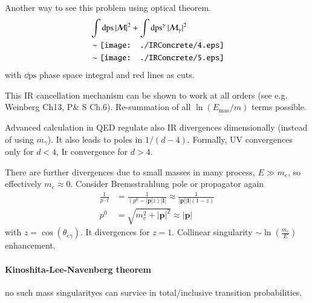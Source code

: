 Another way to see this problem using optical theorem.
\begin{align*}
&\int \dd{\text{ps}} |\M|^2 + \int \dd{\text{ps}^\gamma} |\M_\gamma|^2   \\
&\sim \vcenter{\hbox{\texttt{[image: ./IRConcrete/4.eps]}}} \\ 
&\sim \vcenter{\hbox{\texttt{[image: ./IRConcrete/5.eps]}}}
\end{align*}
with $\dd{\text{ps}}$ phase space integral and red lines as cuts.

This IR cancellation mechanism can be shown to work at all orders (see e.g. Weinberg Ch13, P\& S Ch.6). Re-summation of all $\ln(E_\text{mas}/m)$ terms possible.

Advanced calculation in QED regulate also IR divergences dimensionally (instead of using $m_\gamma$). It also leads to poles in $1/(d-4)$. Formally, UV convergences only for $d<4$, Ir convergence for $d>4$.

There are further divergences due to small masses in many process, $E \gg m_e $, so effectively $m_e \approx 0$. Consider Bremsstrahlung pole or propagator again
\begin{align*}
   \frac{1}{p\cdot l} &= \frac{1}{(p^0 - |\pmb{p}| z)|\pmb{l}|} \approx \frac{1}{|\pmb{p}||\pmb{l}| (1-z)} \\
p^0 &= \sqrt{m_e^2 + |\pmb{p}|^2} \approx |\pmb{p}|
\end{align*}
with $z = \cos(\theta_{e \gamma})$. It divergences for $z = 1$. Collinear singularity $\sim \ln(\frac{m_e}{E})$ enhancement.

\paragraph{Kinoshita-Lee-Navenberg theorem}
no such mass singularityes can survice in total/inclusive transition probabilities.

